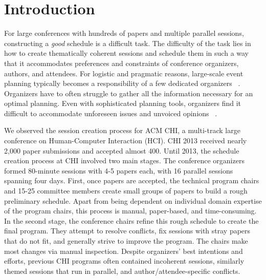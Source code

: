 \documentclass[letterpaper]{article}
\begin{document}
\section{Introduction}
For large conferences with hundreds of papers and multiple parallel sessions, constructing a \emph{good} schedule is a difficult task. The difficulty of the task lies in how to create thematically coherent sessions and schedule them in such a way that it accommodates preferences and constraints of conference organizers, authors, and attendees. For logistic and pragmatic reasons, large-scale event planning typically becomes a responsibility of a few dedicated organizers ~\cite{EventPlanning}. Organizers have to often struggle to gather all the information necessary for an optimal planning. Even with sophisticated planning tools, organizers find it difficult to accommodate unforeseen issues and unvoiced opinions ~\cite{CoDesign}.

We observed the session creation process for ACM CHI, a multi-track large conference on Human-Computer Interaction (HCI). CHI 2013 received nearly 2,000 paper submissions and accepted almost 400. Until 2013, the schedule creation process at CHI involved two main stages. The conference organizers formed 80-minute sessions with 4-5 papers each, with 16 parallel sessions spanning four days. First, once papers are accepted, the technical program chairs and 15-25 committee members create small groups of papers to build a rough preliminary schedule. Apart from being dependent on individual domain expertise of the program chairs, this process is manual, paper-based, and time-consuming. In the second stage, the conference chairs refine this rough schedule to create the final program. They attempt to resolve conflicts, fix sessions with stray papers that do not fit, and generally strive to improve the program. The chairs make most changes via manual inspection. Despite organizers' best intentions and efforts, previous CHI programs often contained incoherent sessions, similarly themed sessions that run in parallel, and author/attendee-specific conflicts.
\end{document}
